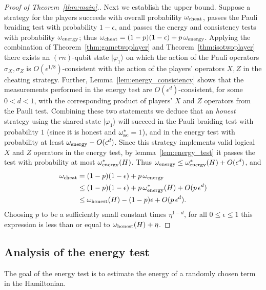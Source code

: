 \documentclass[11pt,letterpaper]{article}
\newcommand{\<}{\langle}
\renewcommand{\>}{\rangle}
\newcommand{\lemref}[1]{Lemma~\ref{lem:#1}}
\newcommand{\ket}[1]{| #1 \>}
\newcommand{\eps}{\epsilon}
\newcommand{\wg}{\omega^*_{\ensuremath{\rm ac}}}
\newcommand{\energy}{\ensuremath{\rm energy}}
\begin{document}
\begin{proof}[Proof of Theorem~\ref{thm:main}.]
Next we establish the upper bound. Suppose a strategy for the players succeeds 
  with overall probability $\omega_{\rm cheat}$, passes the Pauli braiding test with probability $1 -
  \eps$, and passes the energy and consistency tests with probability
  $\omega_{\energy}$; thus $\omega_{\rm cheat} = (1-p)(1 - \eps) + p \,\omega_{\energy}$.
	Applying the combination of Theorem~\ref{thm:gametwoplayer} and Theorem~\ref{thm:isotwoplayer} there exists an $(rn)$-qubit state $\ket{\varphi_1}$ on which the action of the Pauli operators $\sigma_X, \sigma_Z$ is $O(\eps^{1/8})$-consistent with the action of the players' operators $X, Z$ in the cheating strategy. Further, \lemref{energy_consistency} shows that the measurements performed in the energy test are $O(\eps^{d})$-consistent, for some $0<d<1$, with the corresponding product of players' $X$ and $Z$ operators from the Pauli test. Combining these two statements we deduce that an \emph{honest} strategy using the shared state $\ket{\varphi_1}$ will succeed in the Pauli braiding test with probability $1$ (since it is honest and $\wg=1$), and in the energy test with probability at least  $\omega_{\energy} - O(\eps^{d})$.  
	Since this strategy implements valid logical $X$ and $Z$ operators in the energy test, by
  lemma~\ref{lem:energy_test} it passes   the  test
  with probability at most $\omega^*_{\energy}(H)$. Thus
 $   \omega_{\energy} \leq \omega^*_{\energy}(H) + O({\eps^{d}}) $, and
\begin{align*}
    \omega_{\rm cheat} &= (1-p)(1 - \eps) + p\, \omega_{\energy} \\
                   &\leq (1-p)(1- \eps) + p\, \omega_{\energy}^*(H) + O(p\, \eps^{d}) \\
    &\leq \omega_{\rm honest}(H) - (1-p)\eps + O(p\,{\eps^{d}}).
  \end{align*}
  Choosing $p$ to be a sufficiently small constant times $\eta^{1-d}$, 
  for all $0\leq \eps\leq 1$ this  expression is
  less than or equal to $\omega_{\rm honest}(H) + \eta$. 
\end{proof}




 

\subsection{Analysis of the energy test}
\label{sec:energytest}

The goal of the energy  test is to estimate the energy of a randomly
chosen  term in the Hamiltonian. 
\end{document}
